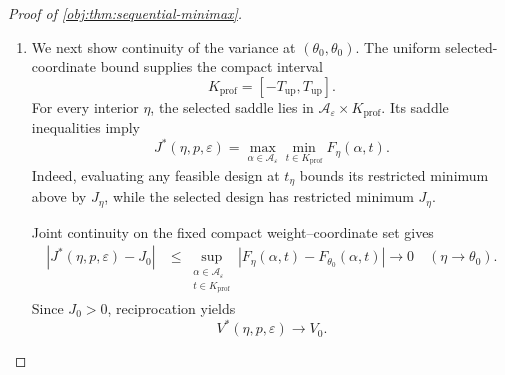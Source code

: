 \documentclass[11pt]{article}
\begin{document}
\begin{proof}[Proof of \cref{obj:thm:sequential-minimax}]
\begin{enumerate}
Given the pilot prefix, the main corrections are independent with mean
\(\tau(\theta')-\tau(\widetilde\theta(\mathbf r))\) and variance
\(\sigma^2(\theta',\widetilde\theta(\mathbf r))\). The estimator formula therefore gives
\[
\mathbb E_{\theta'}^{\mathcal P^*}
\!\left[
\widehat\tau^*-\tau(\theta')
\mid H_{m_n}=\mathbf r
\right]=0.
\]
Expanding the square of the centered sum, the off-diagonal terms vanish by independence and zero means, so
\[
\mathbb E_{\theta'}^{\mathcal P^*}
\!\left[
n(\widehat\tau^*-\tau(\theta'))^2
\mid H_{m_n}=\mathbf r
\right]
=
\frac n{N_n}\,
\sigma^2(\theta',\widetilde\theta(\mathbf r)).
\]
Define the prefix-averaged variance
\[
\overline\sigma_n^2(\theta')
=
\sum_{\mathbf r\in\{0,1,2,3\}^{m_n}}
\omega_{n,\theta'}(\mathbf r)
\sigma^2(\theta',\widetilde\theta(\mathbf r)).
\]
Summing the conditional identity over the finite prefix space gives, for every admissible \(h\),
\[
\mathbb E_{\theta_{n,h}}^{\mathcal P^*}
\!\left[(U_{n,h}^{\mathcal P^*})^2\right]
=
\frac n{N_n}\,
\overline\sigma_n^2(\theta_{n,h}),
\qquad
0\le\overline\sigma_n^2(\theta_{n,h})\le C_\phi^2.
\]

\item
We next show continuity of the variance at \((\theta_0,\theta_0)\). The uniform selected-coordinate bound supplies the compact interval
\[
K_{\mathrm{prof}}=[-T_{\mathrm{up}},T_{\mathrm{up}}].
\]
For every interior \(\eta\), the selected saddle lies in
\(\mathcal A_\varepsilon\times K_{\mathrm{prof}}\). Its saddle inequalities imply
\[
J^*(\eta,p,\varepsilon)
=
\max_{\alpha\in\mathcal A_\varepsilon}
\min_{t\in K_{\mathrm{prof}}}F_\eta(\alpha,t).
\]
Indeed, evaluating any feasible design at \(t_\eta\) bounds its restricted minimum above by \(J_\eta\), while the selected design has restricted minimum \(J_\eta\).

Joint continuity on the fixed compact weight--coordinate set gives
\[
\begin{aligned}
|J^*(\eta,p,\varepsilon)-J_0|
&\le
\sup_{\substack{\alpha\in\mathcal A_\varepsilon\\
t\in K_{\mathrm{prof}}}}
|F_\eta(\alpha,t)-F_{\theta_0}(\alpha,t)|
\longrightarrow0
\quad(\eta\to\theta_0).
\end{aligned}
\]
Since \(J_0>0\), reciprocation yields
\[
V^*(\eta,p,\varepsilon)\longrightarrow V_0.
\]


\end{enumerate}
\end{proof}
\end{document}

